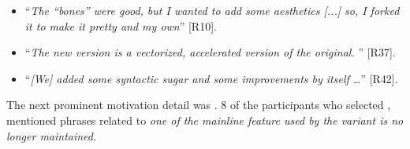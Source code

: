 \begin{itemize}[leftmargin=*]
\item ``\emph{The ``bones'' were good, but I wanted to add some aesthetics [...] %
so, I forked it to make it pretty and my own}'' [R10].
\item ``\emph{The new version is a vectorized, accelerated version of the original.%
}'' [R37].
\item ``\emph{[We] added some syntactic sugar and some improvements by itself \ldots}'' [R42].
\end{itemize}

\nd The next prominent  motivation detail was .
8 of the participants who selected , mentioned phrases related to \emph{one of the mainline feature used by the variant is no longer maintained}.

